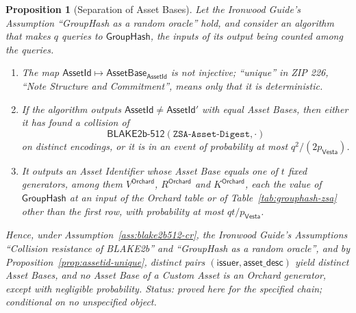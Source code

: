 \documentclass[11pt,a4paper]{article}
\newtheorem{proposition}[theorem]{Proposition}
\theoremstyle{definition}
\newcommand{\Vesta}{\ensuremath{\mathsf{Vesta}}}
\newcommand{\GroupHash}{\ensuremath{\mathsf{GroupHash}}}
\begin{document}
\begin{proposition}[Separation of Asset Bases]\label{prop:assetbase-separation}
Let the \emph{Ironwood Guide}'s Assumption ``GroupHash as a random oracle''
hold, and consider an algorithm that makes $q$ queries to $\GroupHash$, the
inputs of its output being counted among the queries.
\begin{enumerate}
\item The map $\mathsf{AssetId} \mapsto \mathsf{AssetBase}_{\mathsf{AssetId}}$
  is not injective; ``unique'' in ZIP 226, ``Note Structure and
  Commitment'', means only that it is deterministic.
\item If the algorithm outputs $\mathsf{AssetId} \neq \mathsf{AssetId}'$
  with equal Asset Bases, then either it has found a collision of
  \[
    \mathsf{BLAKE2b\text{-}512}(\texttt{ZSA-Asset-Digest}, \cdot)
  \]
  on distinct encodings, or it is in an event of probability at most
  $q^2/(2p_{\Vesta})$.
\item It outputs an Asset Identifier whose Asset Base equals one of $t$
  fixed generators, among them $V^{\mathsf{Orchard}}$,
  $R^{\mathsf{Orchard}}$ and $K^{\mathsf{Orchard}}$, each the value of
  $\GroupHash$ at an input of the Orchard table or of
  Table~\ref{tab:grouphash-zsa} other than the first row, with probability
  at most $qt/p_{\Vesta}$.
\end{enumerate}
Hence, under Assumption~\ref{ass:blake2b512-cr}, the \emph{Ironwood
Guide}'s Assumptions ``Collision resistance of BLAKE2b'' and ``GroupHash as
a random oracle'', and by Proposition~\ref{prop:assetid-unique}, distinct
pairs $(\mathsf{issuer}, \mathsf{asset\_desc})$ yield distinct Asset Bases,
and no Asset Base of a Custom Asset is an Orchard generator, except with
negligible probability. Status: proved here for the specified chain;
conditional on no unspecified object.
\end{proposition}
\end{document}
